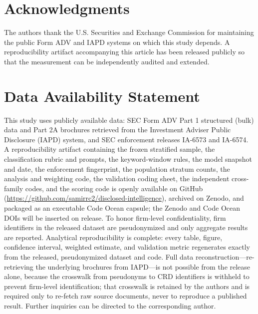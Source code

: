 \documentclass[utf8]{FrontiersinHarvard}
\begin{document}
\section*{Acknowledgments}
The authors thank the U.S. Securities and Exchange Commission for maintaining the public Form ADV and IAPD systems on which this study depends. A reproducibility artifact accompanying this article has been released publicly so that the measurement can be independently audited and extended.

\section*{Data Availability Statement}
This study uses publicly available data: SEC Form ADV Part 1 structured (bulk) data and Part 2A brochures retrieved from the Investment Adviser Public Disclosure (IAPD) system, and SEC enforcement releases IA-6573 and IA-6574. A reproducibility artifact containing the frozen stratified sample, the classification rubric and prompts, the keyword-window rules, the model snapshot and date, the enforcement fingerprint, the population stratum counts, the analysis and weighting code, the validation coding sheet, the independent cross-family codes, and the scoring code is openly available on GitHub (\url{https://github.com/samirrc2/disclosed-intelligence}), archived on Zenodo, and packaged as an executable Code Ocean capsule; the Zenodo and Code Ocean DOIs will be inserted on release. To honor firm-level confidentiality, firm identifiers in the released dataset are pseudonymized and only aggregate results are reported. Analytical reproducibility is complete: every table, figure, confidence interval, weighted estimate, and validation metric regenerates exactly from the released, pseudonymized dataset and code. Full data reconstruction---re-retrieving the underlying brochures from IAPD---is not possible from the release alone, because the crosswalk from pseudonyms to CRD identifiers is withheld to prevent firm-level identification; that crosswalk is retained by the authors and is required only to re-fetch raw source documents, never to reproduce a published result. Further inquiries can be directed to the corresponding author.




\end{document}
